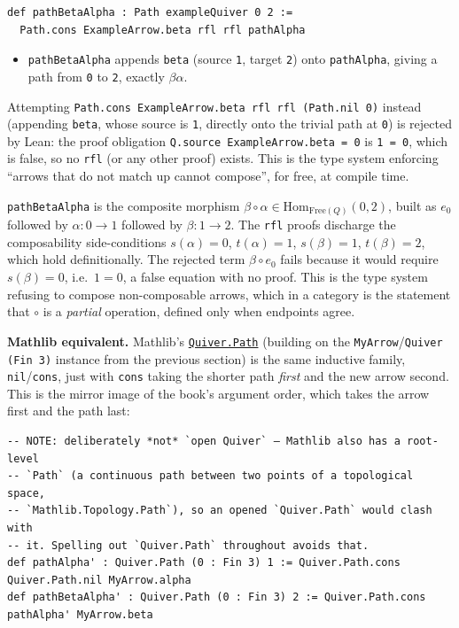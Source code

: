 \begin{lstlisting}
def pathBetaAlpha : Path exampleQuiver 0 2 :=
  Path.cons ExampleArrow.beta rfl rfl pathAlpha
\end{lstlisting}

\begin{itemize}
\tightlist
\item
  \texttt{pathBetaAlpha} appends \texttt{beta} (source \texttt{1}, target \texttt{2}) onto \texttt{pathAlpha}, giving a path from \texttt{0} to \texttt{2}, exactly \(\beta\alpha\).
\end{itemize}

Attempting \texttt{Path.cons ExampleArrow.beta rfl rfl (Path.nil 0)} instead (appending \texttt{beta}, whose source is \texttt{1}, directly onto the trivial path at \texttt{0}) is rejected by Lean: the proof obligation \texttt{Q.source ExampleArrow.beta = 0} is \texttt{1 = 0}, which is false, so no \texttt{rfl} (or any other proof) exists. This is the type system enforcing ``arrows that do not match up cannot compose'', for free, at compile time.

\begin{mathreading}

\texttt{pathBetaAlpha} is the composite morphism \(\beta\circ\alpha \in \mathrm{Hom}_{\mathrm{Free}(Q)}(0,2)\), built as \(e_0\) followed by \(\alpha : 0\to 1\) followed by \(\beta : 1\to 2\). The \texttt{rfl} proofs discharge the composability side-conditions \(s(\alpha)=0\), \(t(\alpha)=1\), \(s(\beta)=1\), \(t(\beta)=2\), which hold definitionally. The rejected term \(\beta\circ e_0\) fails because it would require \(s(\beta) = 0\), i.e.~\(1 = 0\), a false equation with no proof. This is the type system refusing to compose non-composable arrows, which in a category is the statement that \(\circ\) is a \emph{partial} operation, defined only when endpoints agree.

\end{mathreading}

\textbf{Mathlib equivalent.} Mathlib's \href{https://loogle.lean-lang.org/?q=Quiver.Path}{\texttt{Quiver.Path}} (building on the \texttt{MyArrow}/\texttt{Quiver (Fin 3)} instance from the previous section) is the same inductive family, \texttt{nil}/\texttt{cons}, just with \texttt{cons} taking the shorter path \emph{first} and the new arrow second. This is the mirror image of the book's argument order, which takes the arrow first and the path last:

\begin{lstlisting}
-- NOTE: deliberately *not* `open Quiver` — Mathlib also has a root-level
-- `Path` (a continuous path between two points of a topological space,
-- `Mathlib.Topology.Path`), so an opened `Quiver.Path` would clash with
-- it. Spelling out `Quiver.Path` throughout avoids that.
def pathAlpha' : Quiver.Path (0 : Fin 3) 1 := Quiver.Path.cons Quiver.Path.nil MyArrow.alpha
def pathBetaAlpha' : Quiver.Path (0 : Fin 3) 2 := Quiver.Path.cons pathAlpha' MyArrow.beta
\end{lstlisting}


